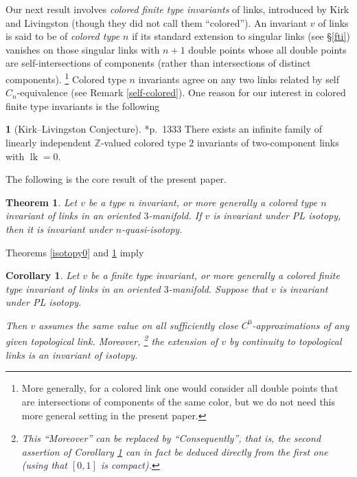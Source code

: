 \documentclass[a4paper,12pt,reqno,oneside]{amsart} %
\theoremstyle{plain}
\newtheorem{mainthm}{Theorem}
\newtheorem{corollary}[theorem]{Corollary}
\theoremstyle{definition}
\theoremstyle{named}
\newtheorem{namedthm}{}
\renewcommand{\:}{\colon}
\def\Z{\mathbb{Z}}
\DeclareMathOperator{\lk}{lk}
\begin{document}
Our next result involves {\it colored finite type invariants} of links, introduced by Kirk and Livingston \cite{KL}
(though they did not call them ``colored'').
An invariant $v$ of links is said to be of {\it colored type $n$} if its standard extension to singular links (see \S\ref{fti})
vanishes on those singular links with $n+1$ double points whose all double points are self-intersections of components (rather 
than intersections of distinct components).%
\footnote{More generally, for a colored link one would consider all double points that are intersections of components of the same color,
but we do not need this more general setting in the present paper.}
Colored type $n$ invariants agree on any two links related by self $C_n$-equivalence (see Remark \ref{self-colored}).
One reason for our interest in colored finite type invariants is the following

\begin{namedthm}[Kirk--Livingston Conjecture] \cite{KL}*{p.\ 1333} \label{kl-conj} There exists an infinite family of linearly 
independent $\Z$-valued colored type $2$ invariants of two-component links with $\lk=0$.
\end{namedthm}

The following is the core result of the present paper.

\begin{mainthm}\label{main1}
Let $v$ be a type $n$ invariant, or more generally a colored type $n$ invariant of links in an oriented $3$-manifold.
If $v$ is invariant under PL isotopy, then it is invariant under $n$-quasi-isotopy.
\end{mainthm}

Theorems \ref{isotopy0} and \ref{main1} imply

\begin{corollary} \label{main1''}
Let $v$ be a finite type invariant, or more generally a colored finite type invariant of links in an oriented $3$-manifold.
Suppose that $v$ is invariant under PL isotopy.

Then $v$ assumes the same value on all sufficiently close $C^0$-approximations of any given topological link. 
Moreover,%
\footnote{This ``Moreover'' can be replaced by ``Consequently'', that is, the second assertion of Corollary \ref{main1''}
can in fact be deduced directly from the first one (using that $[0,1]$ is compact).}
the extension of $v$ by continuity to topological links is an invariant of isotopy.
\end{corollary}
\end{document}
